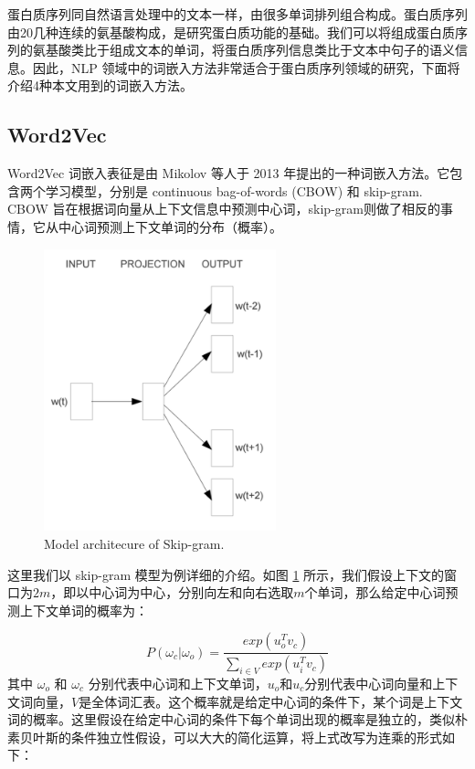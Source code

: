 蛋白质序列同自然语言处理中的文本一样，由很多单词排列组合构成。蛋白质序列由20几种连续的氨基酸构成，是研究蛋白质功能的基础。我们可以将组成蛋白质序列的氨基酸类比于组成文本的单词，将蛋白质序列信息类比于文本中句子的语义信息。因此，NLP 领域中的词嵌入方法非常适合于蛋白质序列领域的研究，下面将介绍4种本文用到的词嵌入方法。

\subsection{Word2Vec}
Word2Vec \cite{mikolov2013distributed} 词嵌入表征是由 Mikolov 等人于 2013 年提出的一种词嵌入方法。它包含两个学习模型，分别是 continuous bag-of-words (CBOW) 和 skip-gram. CBOW 旨在根据词向量从上下文信息中预测中心词，skip-gram则做了相反的事情，它从中心词预测上下文单词的分布（概率）。

\begin{figure}[!htp]
\centering
\includegraphics[width=0.6\textwidth]  {imgs/skip-gram.png} \\
    {Model architecure of Skip-gram\cite{mikolov2013distributed}.}
\label{fig:skip-gram}
\end{figure}

这里我们以 skip-gram 模型为例详细的介绍。如图 \ref{fig:skip-gram} 所示，我们假设上下文的窗口为$2m$，即以中心词为中心，分别向左和向右选取$m$个单词，那么给定中心词预测上下文单词的概率为：

\begin{equation}
    P(\omega_c|\omega_o) = \frac{exp(u_o^{T} v_c)}{\sum_{i \in V} exp(u_i^{T} v_c)}
\tag{3-1}
\end{equation}
其中 $\omega_o$ 和 $\omega_c$ 分别代表中心词和上下文单词，$u_o$和$u_c$分别代表中心词向量和上下文词向量，$V$是全体词汇表。这个概率就是给定中心词的条件下，某个词是上下文词的概率。这里假设在给定中心词的条件下每个单词出现的概率是独立的，类似朴素贝叶斯的条件独立性假设，可以大大的简化运算，将上式改写为连乘的形式如下：

